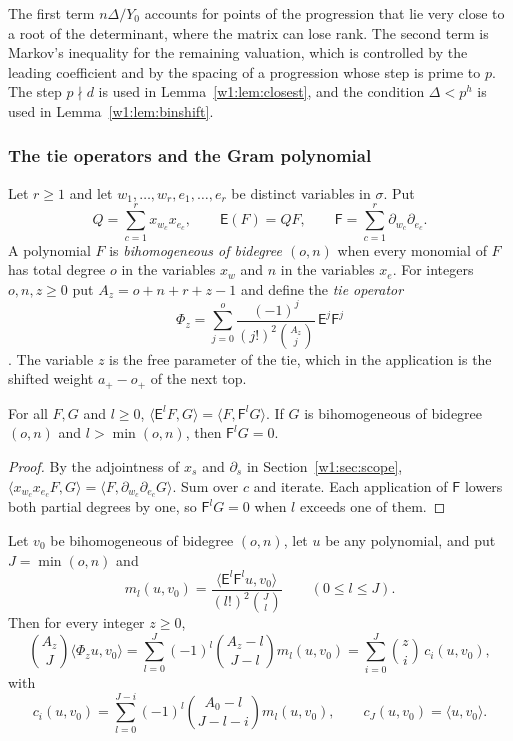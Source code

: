 \begin{remark}
The first term $n\Delta/Y_0$ accounts for points of the progression that lie very close to a root of the determinant, where the matrix can lose rank. The second term is Markov's inequality for the remaining valuation, which is controlled by the leading coefficient and by the spacing of a progression whose step is prime to $p$. The step $p\nmid d$ is used in Lemma~\ref{w1:lem:closest}, and the condition $\Delta<p^h$ is used in Lemma~\ref{w1:lem:binshift}.
\end{remark}

\subsubsection{The tie operators and the Gram polynomial}

Let $r\ge1$ and let $w_1,\dots,w_r,e_1,\dots,e_r$ be distinct variables in $\sigma$. Put
\[
Q=\sum_{c=1}^rx_{w_c}x_{e_c},\qquad \mathsf E(F)=QF,\qquad \mathsf F=\sum_{c=1}^r\partial_{w_c}\partial_{e_c}.
\]
A polynomial $F$ is \emph{bihomogeneous of bidegree $(o,n)$} when every monomial of $F$ has total degree $o$ in the variables $x_w$ and $n$ in the variables $x_e$. For integers $o,n,z\ge0$ put $A_z=o+n+r+z-1$ and define the \emph{tie operator}
\begin{equation}\label{w1:eq:tiephi}
\Phi_z=\sum_{j=0}^{o}\frac{(-1)^j}{(j!)^2\binom{A_z}j}\,\mathsf E^j\mathsf F^j
\end{equation}. The variable $z$ is the free parameter of the tie, which in the application is the shifted weight $a_+-o_+$ of the next top.

\begin{lemma}\label{w1:lem:adj}
For all $F,G$ and $l\ge0$, $\langle\mathsf E^lF,G\rangle=\langle F,\mathsf F^lG\rangle$. If $G$ is bihomogeneous of bidegree $(o,n)$ and $l>\min(o,n)$, then $\mathsf F^lG=0$.
\end{lemma}

\begin{proof}
By the adjointness of $x_s$ and $\partial_s$ in Section~\ref{w1:sec:scope}, $\langle x_{w_c}x_{e_c}F,G\rangle=\langle F,\partial_{w_c}\partial_{e_c}G\rangle$. Sum over $c$ and iterate. Each application of $\mathsf F$ lowers both partial degrees by one, so $\mathsf F^lG=0$ when $l$ exceeds one of them.
\end{proof}

\begin{proposition}\label{w1:prop:tie}
Let $v_0$ be bihomogeneous of bidegree $(o,n)$, let $u$ be any polynomial, and put $J=\min(o,n)$ and
\[
m_l(u,v_0)=\frac{\langle\mathsf E^l\mathsf F^lu,v_0\rangle}{(l!)^2\binom Jl}\qquad(0\le l\le J).
\]
Then for every integer $z\ge0$,
\begin{equation}\label{w1:eq:phipair}
\binom{A_z}J\langle\Phi_zu,v_0\rangle=\sum_{l=0}^J(-1)^l\binom{A_z-l}{J-l}m_l(u,v_0)=\sum_{i=0}^J\binom zi\,c_i(u,v_0),
\end{equation}
with
\[
c_i(u,v_0)=\sum_{l=0}^{J-i}(-1)^l\binom{A_0-l}{J-l-i}m_l(u,v_0),\qquad c_J(u,v_0)=\langle u,v_0\rangle .
\]
\end{proposition}


